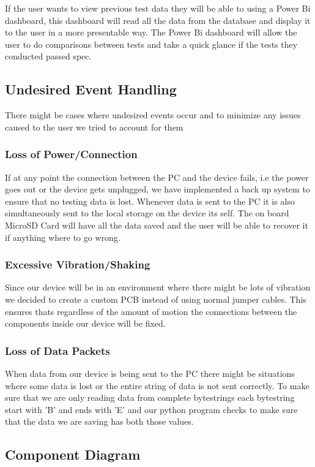 \documentclass[12pt, titlepage]{article}
\begin{document}
If the user wants to view previous test data they will be able to using a Power Bi dashboard, this dashboard will read all the data from the database and display it to the user in a more presentable way. The Power Bi dashboard will allow the user to do comparisons between tests and take a quick glance if the tests they conducted passed spec.

\subsection{Undesired Event Handling}
There might be cases where undesired events occur and to minimize any issues caused to the user we tried to account for them
\subsubsection{Loss of Power/Connection}
If at any point the connection between the PC and the device fails, i.e the power goes out or the device gets unplugged, we have implemented a back up system to ensure that no testing data is lost. Whenever data is sent to the PC it is also simultaneously sent to the local storage on the device its self. The on board MicroSD Card will have all the data saved and the user will be able to recover it if anything where to go wrong.

\subsubsection{Excessive Vibration/Shaking}
Since our device will be in an environment where there might be lots of vibration we decided to create a custom PCB instead of using normal jumper cables. This ensures thats regardless of the amount of motion the connections between the components inside our device will be fixed.

\subsubsection{Loss of Data Packets}
When data from our device is being sent to the PC there might be situations where some data is lost or the entire string of data is not sent correctly. To make sure that we are only reading data from complete bytestrings each bytestring start with 'B' and ends with 'E' and our python program checks to make sure that the data we are saving has both those values.


\subsection{Component Diagram}
\end{document}
